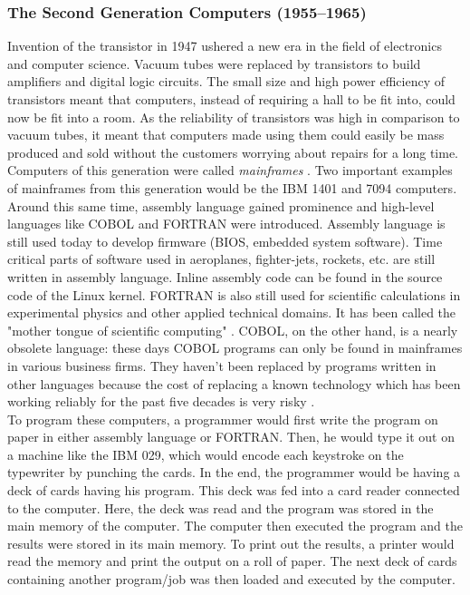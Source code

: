 \subsubsection{The Second Generation Computers (1955--1965)}
Invention of the transistor in 1947 ushered a new era in the field of electronics and computer science. Vacuum tubes were replaced by transistors to build amplifiers and digital logic circuits. The small size and high power efficiency of transistors meant that computers, instead of requiring a hall to be fit into, could now be fit into a room. As the reliability of transistors was high in comparison to vacuum tubes, it meant that computers made using them could easily be mass produced and sold without the customers worrying about repairs for a long time. Computers of this generation were called \textit{mainframes} \cite{tannenbaum2003operating}. Two important examples of mainframes from this generation would be the IBM 1401 and 7094 computers.\\
Around this same time, assembly language gained prominence and high-level languages like COBOL and FORTRAN were introduced. Assembly language is still used today to develop firmware (BIOS, embedded system software). Time critical parts of software used in aeroplanes, fighter-jets, rockets, etc. are still written in assembly language. Inline assembly code can be found in the source code of the Linux kernel. FORTRAN is also still used  for scientific calculations in experimental physics and other applied technical domains. It has been called the "mother tongue of scientific computing" \cite{halpern1993large}. COBOL, on the other hand, is a nearly obsolete language: these days COBOL programs can only be found in mainframes in various business firms. They haven't been replaced by programs written in other languages because the cost of replacing a known technology which has been working reliably for the past five decades is very risky \cite{mitchell2006cobol}.\\ 
To program these computers, a programmer would first write the program on paper in either assembly language or FORTRAN. Then, he would type it out on a machine like the IBM 029, which would encode each keystroke on the typewriter by punching the cards. In the end, the programmer would be having a deck of cards having his program. This deck was fed into a card reader connected to the computer. Here, the deck was read and the program was stored in the main memory of the computer. The computer then executed the program and the results were stored in its main memory. To print out the results, a printer would read the memory and print the output on a roll of paper. The next deck of cards containing another program/job was then loaded and executed by the computer.\\
